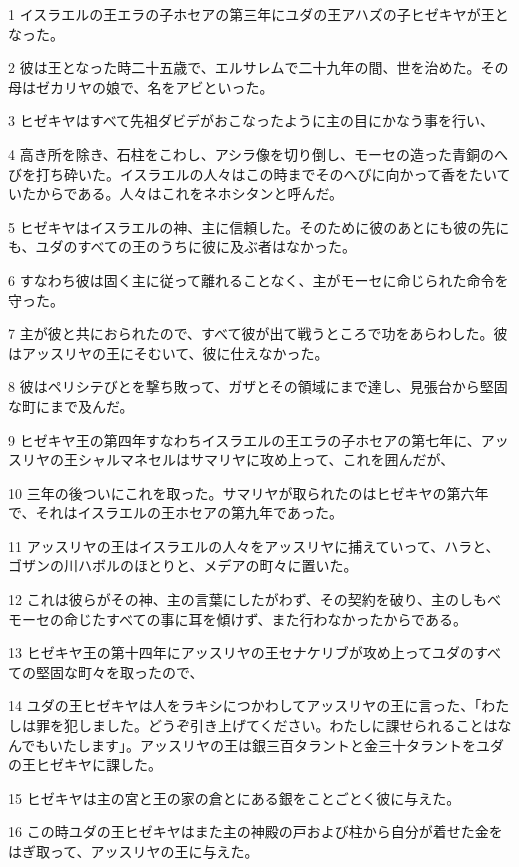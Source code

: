 \par 1 イスラエルの王エラの子ホセアの第三年にユダの王アハズの子ヒゼキヤが王となった。
\par 2 彼は王となった時二十五歳で、エルサレムで二十九年の間、世を治めた。その母はゼカリヤの娘で、名をアビといった。
\par 3 ヒゼキヤはすべて先祖ダビデがおこなったように主の目にかなう事を行い、
\par 4 高き所を除き、石柱をこわし、アシラ像を切り倒し、モーセの造った青銅のへびを打ち砕いた。イスラエルの人々はこの時までそのへびに向かって香をたいていたからである。人々はこれをネホシタンと呼んだ。
\par 5 ヒゼキヤはイスラエルの神、主に信頼した。そのために彼のあとにも彼の先にも、ユダのすべての王のうちに彼に及ぶ者はなかった。
\par 6 すなわち彼は固く主に従って離れることなく、主がモーセに命じられた命令を守った。
\par 7 主が彼と共におられたので、すべて彼が出て戦うところで功をあらわした。彼はアッスリヤの王にそむいて、彼に仕えなかった。
\par 8 彼はペリシテびとを撃ち敗って、ガザとその領域にまで達し、見張台から堅固な町にまで及んだ。
\par 9 ヒゼキヤ王の第四年すなわちイスラエルの王エラの子ホセアの第七年に、アッスリヤの王シャルマネセルはサマリヤに攻め上って、これを囲んだが、
\par 10 三年の後ついにこれを取った。サマリヤが取られたのはヒゼキヤの第六年で、それはイスラエルの王ホセアの第九年であった。
\par 11 アッスリヤの王はイスラエルの人々をアッスリヤに捕えていって、ハラと、ゴザンの川ハボルのほとりと、メデアの町々に置いた。
\par 12 これは彼らがその神、主の言葉にしたがわず、その契約を破り、主のしもべモーセの命じたすべての事に耳を傾けず、また行わなかったからである。
\par 13 ヒゼキヤ王の第十四年にアッスリヤの王セナケリブが攻め上ってユダのすべての堅固な町々を取ったので、
\par 14 ユダの王ヒゼキヤは人をラキシにつかわしてアッスリヤの王に言った、「わたしは罪を犯しました。どうぞ引き上げてください。わたしに課せられることはなんでもいたします」。アッスリヤの王は銀三百タラントと金三十タラントをユダの王ヒゼキヤに課した。
\par 15 ヒゼキヤは主の宮と王の家の倉とにある銀をことごとく彼に与えた。
\par 16 この時ユダの王ヒゼキヤはまた主の神殿の戸および柱から自分が着せた金をはぎ取って、アッスリヤの王に与えた。
